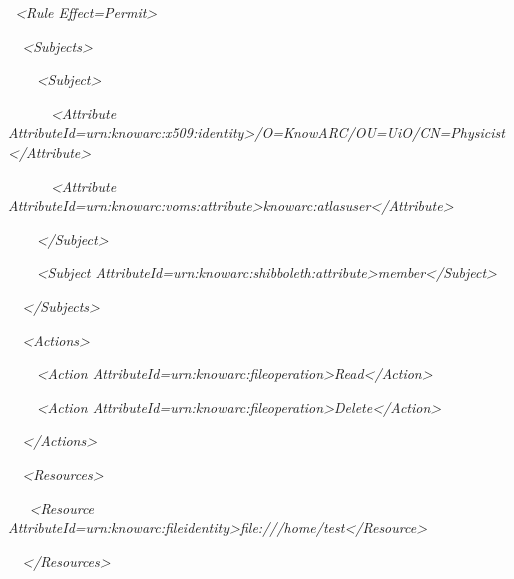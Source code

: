 \documentclass[a4paper]{article}
\begin{document}
{\itshape\color{black}
\ {\textless}Rule
Effect={\textquotedbl}Permit{\textquotedbl}{\textgreater}}

{\itshape\color{black}
\ \ {\textless}Subjects{\textgreater}}

{\itshape\color{black}
\ \ \ \ {\textless}Subject{\textgreater}}

{\itshape\color{black}
\ \ \ \ \ \ {\textless}Attribute
AttributeId={\textquotedbl}urn:knowarc:x509:identity{\textquotedbl}{\textgreater}/O=KnowARC/OU=UiO/CN=Physicist{\textless}/Attribute{\textgreater}}

{\itshape\color{black}
\ \ \ \ \ \ {\textless}Attribute
AttributeId={\textquotedbl}urn:knowarc:voms:attribute{\textgreater}knowarc:atlasuser{\textless}/Attribute{\textgreater}}

{\itshape\color{black}
\ \ \ \ {\textless}/Subject{\textgreater}}

{\itshape\color{black}
\ \ \ \ {\textless}Subject
AttributeId={\textquotedbl}urn:knowarc:shibboleth:attribute{\textquotedbl}{\textgreater}member{\textless}/Subject{\textgreater}}

{\itshape\color{black}
\ \ {\textless}/Subjects{\textgreater}}

{\itshape\color{black}
\ \ {\textless}Actions{\textgreater}}

{\itshape\color{black}
\ \ \ \ {\textless}Action
AttributeId={\textquotedbl}urn:knowarc:fileoperation{\textquotedbl}{\textgreater}Read{\textless}/Action{\textgreater}}

{\itshape\color{black}
\ \ \ \ {\textless}Action
AttributeId={\textquotedbl}urn:knowarc:fileoperation{\textquotedbl}{\textgreater}Delete{\textless}/Action{\textgreater}
\ \ }

{\itshape\color{black}
\ \ {\textless}/Actions{\textgreater}}

{\itshape\color{black}
\ \ {\textless}Resources{\textgreater}}

{\itshape\color{black}
\ \ \ {\textless}Resource
AttributeId={\textquotedbl}urn:knowarc:fileidentity{\textquotedbl}{\textgreater}file:///home/test{\textless}/Resource{\textgreater}}

{\itshape\color{black}
\ \ {\textless}/Resources{\textgreater}}
\end{document}
